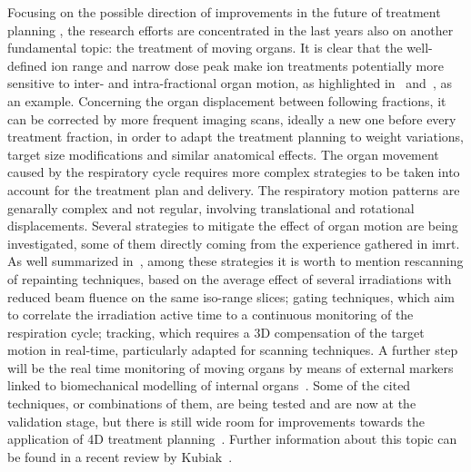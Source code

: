Focusing on the possible direction of improvements in the future of treatment planning , the research efforts are concentrated in the last years also on another fundamental topic: the treatment of moving organs. It is clear that the well-defined ion range and narrow dose peak make ion treatments potentially more sensitive to inter- and intra-fractional organ motion, as highlighted in~\cite{Phillips1992, Bert2008, Engelsman2013} and~\cite{Thornqvist2013}, as an example. Concerning the organ displacement between following fractions, it can be corrected by more frequent imaging scans, ideally a new one before every treatment fraction, in order to adapt the treatment planning to weight variations, target size modifications and similar anatomical effects. The organ movement caused by the respiratory cycle requires more complex strategies to be taken into account for the treatment plan and delivery. The respiratory motion patterns are genarally complex and not regular, involving translational and rotational displacements. Several strategies to mitigate the effect of organ motion are being investigated, some of them directly coming from the experience gathered in \gls{imrt}. As well summarized in~\cite{Schardt2010}, among these strategies it is worth to mention rescanning of repainting techniques, based on the average effect of several irradiations with reduced beam fluence on the same iso-range slices; gating techniques, which aim to correlate the irradiation active time to a continuous monitoring of the respiration cycle; tracking, which requires a 3D compensation of the target motion in real-time, particularly adapted for scanning techniques. A further step will be the real time monitoring of moving organs by means of external markers linked to biomechanical modelling of internal organs~\parencite{Manescu2013}. Some of the cited techniques, or combinations of them, are being tested and are now at the validation stage, but there is still wide room for improvements towards the application of 4D treatment planning~\parencite{Graeff2013, Bert2017}. Further information about this topic  can be found in a recent review by Kubiak~\parencite{Kubiak2016}.    
